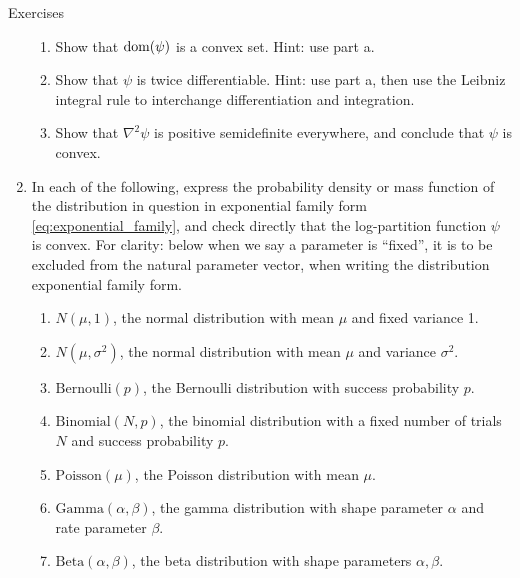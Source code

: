 \begin{xcb}{Exercises}
\begin{enumerate}[label=\thechapter.\arabic*]
\begin{enumerate}[label=\alph*.]
\item Show that $\operatorname{dom}(\psi)$ is a convex set. Hint: use part a.

\item Show that $\psi$ is twice differentiable. Hint: use part a, then use 
  the Leibniz integral rule to interchange differentiation and integration. 

\item Show that $\nabla^2 \psi$ is positive semidefinite everywhere, and
  conclude that $\psi$ is convex. 
\end{enumerate}

\item \label{ex:exponential_family_examples} 
  In each of the following, express the probability density or mass function of
  the distribution in question in exponential family form
  \eqref{eq:exponential_family}, and check directly that the log-partition
  function $\psi$ is convex. For clarity: below when we say a parameter is 
  ``fixed'', it is to be excluded from the natural parameter vector, when
  writing the distribution exponential family form.     

\begin{enumerate}[label=\alph*.]
\item $N(\mu,1)$, the normal distribution with mean $\mu$ and fixed variance 1. 

\item $N(\mu, \sigma^2)$, the normal distribution with mean $\mu$ and variance 
  $\sigma^2$. 

\item $\mathrm{Bernoulli}(p)$, the Bernoulli distribution with success
  probability $p$. 

\item $\mathrm{Binomial}(N, p)$, the binomial distribution with a fixed number
  of trials $N$ and success probability $p$.

\item $\mathrm{Poisson}(\mu)$, the Poisson distribution with mean $\mu$.

\item $\mathrm{Gamma}(\alpha, \beta)$, the gamma distribution with shape
  parameter $\alpha$ and rate parameter $\beta$. 

\item $\mathrm{Beta}(\alpha, \beta)$, the beta distribution with shape
  parameters $\alpha, \beta$.
\end{enumerate}


\end{enumerate}
\end{xcb}
